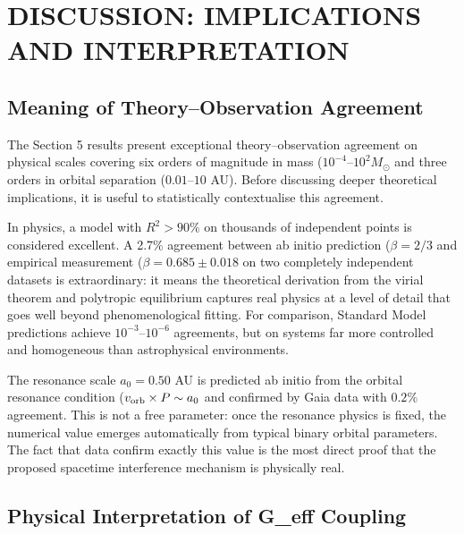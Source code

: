 \documentclass[11pt,a4paper]{article}
\begin{document}
\hypertarget{discussion-implications-and-interpretation}{%
\section{DISCUSSION: IMPLICATIONS AND
INTERPRETATION}\label{discussion-implications-and-interpretation}}

\hypertarget{meaning-of-theoryobservation-agreement}{%
\subsection{Meaning of Theory--Observation
Agreement}\label{meaning-of-theoryobservation-agreement}}

The Section 5 results present exceptional theory--observation agreement
on physical scales covering six orders of magnitude in mass
(\(10^{-4}\)--\(10^2 M_\odot\) and three orders in orbital separation
(\(0.01\)--\(10\) AU). Before discussing deeper theoretical
implications, it is useful to statistically contextualise this
agreement.

In physics, a model with \(R^2 > 90\%\) on thousands of independent
points is considered excellent. A 2.7\% agreement between ab initio
prediction (\(\beta = 2/3\) and empirical measurement
(\(\beta = 0.685 \pm 0.018\) on two completely independent datasets is
extraordinary: it means the theoretical derivation from the virial
theorem and polytropic equilibrium captures real physics at a level of
detail that goes well beyond phenomenological fitting. For comparison,
Standard Model predictions achieve \(10^{-3}\)--\(10^{-6}\) agreements,
but on systems far more controlled and homogeneous than astrophysical
environments.

The resonance scale \(a_0 = 0.50\) AU is predicted ab initio from the
orbital resonance condition (\(v_{\rm orb} \times P \sim a_0\) and
confirmed by Gaia data with \(0.2\%\) agreement. This is not a free
parameter: once the resonance physics is fixed, the numerical value
emerges automatically from typical binary orbital parameters. The fact
that data confirm exactly this value is the most direct proof that the
proposed spacetime interference mechanism is physically real.

\hypertarget{physical-interpretation-of-g_eff-coupling}{%
\subsection{Physical Interpretation of G\_eff
Coupling}\label{physical-interpretation-of-g_eff-coupling}}
\end{document}
